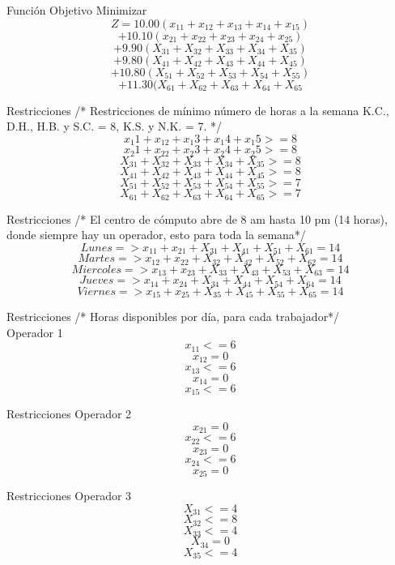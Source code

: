 \documentclass{beamer}
\begin{document}
\begin{frame}[fragile]{Funci\'on Objetivo}
Minimizar
\[Z = 10.00 (x_{11} + x_{12} +x_{13}+x_{14} +x_{15}) \]
\[+ 10.10 (x_{21} + x_{22} +x_{23}+x_{24} + x_{25})\]
\[+  9.90 (X_{31} + X_{32} +X_{33}+X_{34} +X_{35})\]
\[+ 9.80  (X_{41} + X_{42} +X_{43}+X_{44} +X_{45})\]
\[+ 10.80  (X_{51} + X_{52} +X_{53}+X_{54} +X_{55})\]
\[+ 11.30  (X_{61} + X_{62} +X_{63}+X_{64} +X_{65}\]

\end{frame}

\begin{frame}[fragile]{Restricciones}
/* Restricciones  de m\'inimo n\'umero de horas a la semana K.C., D.H., H.B. y S.C. = 8, K.S. y N.K. = 7. */\\
\[x_{1}1 + x_{12} +x_{1}3+x_{1}4 +x_{1}5 >=8\]
\[x_{2}1 + x_{22} +x_{2}3+x_{2}4 + x_{2}5 >= 8\]
\[X_{31} + X_{32} +X_{33}+X_{34} +X_{35} >= 8\]
\[X_{41} + X_{42} +X_{43}+X_{44} +X_{45} >= 8\]
\[X_{51} + X_{52} +X_{53}+X_{54} +X_{55} >= 7\]
\[X_{61} + X_{62} +X_{63}+X_{64} +X_{65} >= 7\]
\end{frame}
\begin{frame}[fragile]{Restricciones}
/* El centro de c\'omputo abre de 8 am hasta 10 pm  (14 horas), donde siempre hay un operador, esto para toda la semana*/\\
\[Lunes => x_{11} + x_{21} + X_{31} +X_{41} + X_{51} +X_{61} = 14  \]
\[Martes=> x_{12} + x_{22} + X_{32} +X_{42} + X_{52} + X_{62} = 14\]
\[Miercoles=> x_{13} + x_{23} + X_{33} +X_{43} + X_{53} +X_{63} = 14\]
\[Jueves => x_{14} + x_{24} + X_{34} +X_{44} + X_{54} +X_{64} = 14\]
\[Viernes => x_{15} + x_{25} + X_{35} +X_{45} + X_{55} +X_{65} = 14  \]

\end{frame}
\begin{frame}[fragile]{Restricciones}
/* Horas disponibles por d\'ia, para cada trabajador*/\\
Operador 1\\
    \[x_{11} <= 6\]
    \[x_{12} = 0\]
    \[x_{13} <= 6\]
    \[x_{14}  = 0\]
    \[x_{15} <= 6\]
\end{frame}
\begin{frame}[fragile]{Restricciones}
Operador 2\\
    \[x_{21} = 0 \]
    \[x_{22} <= 6\]
    \[x_{23} = 0\]
    \[x_{24}  <= 6\]
    \[x_{25} = 0\]
\end{frame}
\begin{frame}[fragile]{Restricciones}
Operador 3\\
    \[X_{31} <= 4 \]
    \[X_{32} <= 8\]
    \[X_{33} <= 4\]
    \[X_{34}  = 0\]
    \[X_{35} <= 4\]
\end{frame}
\end{document}
